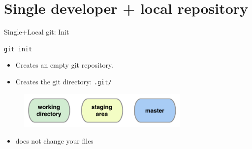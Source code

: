 \documentclass{beamer}
\newcommand{\git}{git\xspace}
\begin{document}

\section[Single+Local]{Single developer + local repository}




\begin{frame}{Single+Local \git: Init}
  \begin{center}
    \texttt{git init}
  \end{center}
  \begin{itemize}
  \item Creates an empty \git repository.
  \item Creates the git directory: \texttt{.git/}
  \end{itemize}
  \begin{figure}
    \centering
    \includegraphics[width=0.75\textwidth]{figs/local-init}
  \end{figure}

\begin{itemize}
   \item<alert@2> does not change your files
\end{itemize}
\end{frame}

\end{document}
